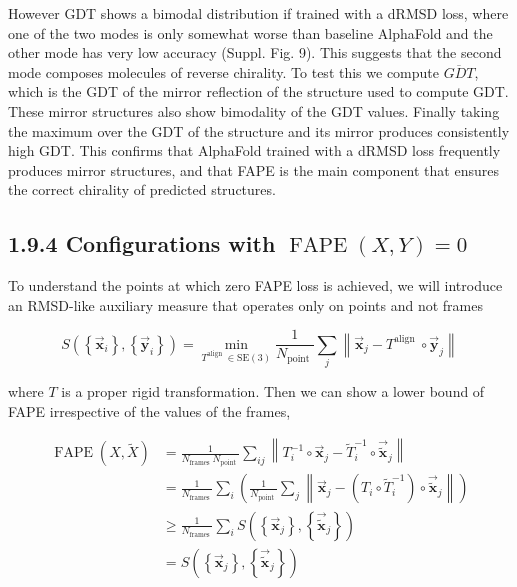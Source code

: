 \documentclass[10pt]{article}
\begin{document}
However GDT shows a bimodal distribution if trained with a dRMSD loss, where one of the two modes is only somewhat worse than baseline AlphaFold and the other mode has very low accuracy (Suppl. Fig. 9). This suggests that the second mode composes molecules of reverse chirality. To test this we compute $\overline{G D T}$, which is the GDT of the mirror reflection of the structure used to compute GDT. These mirror structures also show bimodality of the GDT values. Finally taking the maximum over the GDT of the structure and its mirror produces consistently high GDT. This confirms that AlphaFold trained with a dRMSD loss frequently produces mirror structures, and that FAPE is the main component that ensures the correct chirality of predicted structures.

\subsection*{1.9.4 Configurations with $\operatorname{FAPE}(X, Y)=0$}
To understand the points at which zero FAPE loss is achieved, we will introduce an RMSD-like auxiliary measure that operates only on points and not frames


\begin{equation*}
S\left(\left\{\overrightarrow{\mathbf{x}}_{i}\right\},\left\{\overrightarrow{\mathbf{y}}_{i}\right\}\right)=\min _{T^{\text {align }} \in \mathrm{SE}(3)} \frac{1}{N_{\text {point }}} \sum_{j}\left\|\overrightarrow{\mathbf{x}}_{j}-T^{\text {align }} \circ \overrightarrow{\mathbf{y}}_{j}\right\| \tag{18}
\end{equation*}


where $T$ is a proper rigid transformation. Then we can show a lower bound of FAPE irrespective of the values of the frames,


\begin{align*}
\operatorname{FAPE}(X, \tilde{X}) & =\frac{1}{N_{\text {frames }} N_{\text {point }}} \sum_{i j}\left\|T_{i}^{-1} \circ \overrightarrow{\mathbf{x}}_{j}-\tilde{T}_{i}^{-1} \circ \overrightarrow{\tilde{\mathbf{x}}}_{j}\right\|  \tag{19}\\
& =\frac{1}{N_{\text {frames }}} \sum_{i}\left(\frac{1}{N_{\text {point }}} \sum_{j}\left\|\overrightarrow{\mathbf{x}}_{j}-\left(T_{i} \circ \tilde{T}_{i}^{-1}\right) \circ \overrightarrow{\tilde{\mathbf{x}}}_{j}\right\|\right)  \tag{20}\\
& \geq \frac{1}{N_{\text {frames }}} \sum_{i} S\left(\left\{\overrightarrow{\mathbf{x}}_{j}\right\},\left\{\overrightarrow{\tilde{\mathbf{x}}}_{j}\right\}\right)  \tag{21}\\
& =S\left(\left\{\overrightarrow{\mathbf{x}}_{j}\right\},\left\{\overrightarrow{\tilde{\mathbf{x}}}_{j}\right\}\right) \tag{22}
\end{align*}
\end{document}
